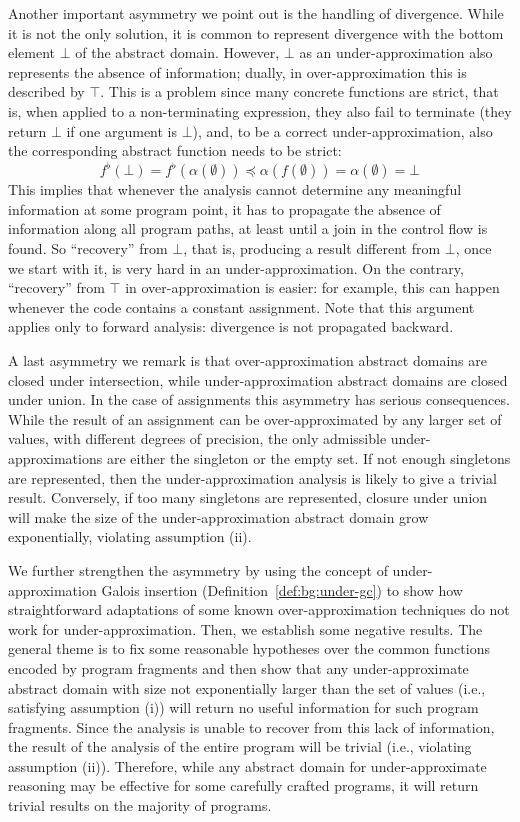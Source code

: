 Another important asymmetry we point out is the handling of divergence.
While it is not the only solution, it is common to represent divergence with the bottom element $\bot$ of the abstract domain. However, $\bot$ as an under-approximation also represents the absence of information; dually, in over-approximation this is described by $\top$. This is a problem since many concrete functions are strict, that is, when applied to a non-terminating expression, they also fail to terminate (they return $\bot$ if one argument is $\bot$), and, to be a correct under-approximation, also the corresponding abstract function needs to be strict:
\[
f^{\flat}(\bot) = f^{\flat}(\alpha(\emptyset)) \preceq \alpha(f(\emptyset)) = \alpha(\emptyset) = \bot
\]
This implies that whenever the analysis cannot determine any meaningful information at some program point, it has to propagate the absence of information along all program paths, at least until a join in the control flow is found.
So ``recovery'' from $\bot$, that is, producing a result different from $\bot$, once we start with it, is very hard in an under-approximation. On the contrary, ``recovery'' from $\top$ in over-approximation is easier: for example, this can happen whenever the code contains a constant assignment. Note that this argument applies only to forward analysis: divergence is not propagated backward.

A last asymmetry we remark is that over-approximation abstract domains are closed under intersection, while under\hyp{}approximation abstract domains are closed under union. In the case of assignments this asymmetry has serious consequences. While the result of an assignment can be over-approximated by any larger set of values, with different degrees of precision, the only admissible under-approximations are either the singleton or the empty set. If not enough singletons are represented, then the under-approximation analysis is likely to give a trivial result. Conversely, if too many singletons are represented, closure under union will make the size of the under-approximation abstract domain grow exponentially, violating assumption (ii).

We further strengthen the asymmetry by using the concept of under-approximation Galois insertion (Definition~\ref{def:bg:under-gc}) to show how straightforward adaptations of some known over-approximation techniques do not work for under-approximation.
Then, we establish some negative results. The general theme is to fix some reasonable hypotheses over the common functions encoded by program fragments and then show that any under-approximate abstract domain with size not exponentially larger than the set of values (i.e., satisfying assumption (i)) will return no useful information for such program fragments.
Since the analysis is unable to recover from this lack of information, the result of the analysis of the entire program will be trivial (i.e., violating assumption (ii)).
Therefore, while any abstract domain for under-approximate reasoning may be effective for some carefully crafted programs, it will return trivial results on the majority of programs.

